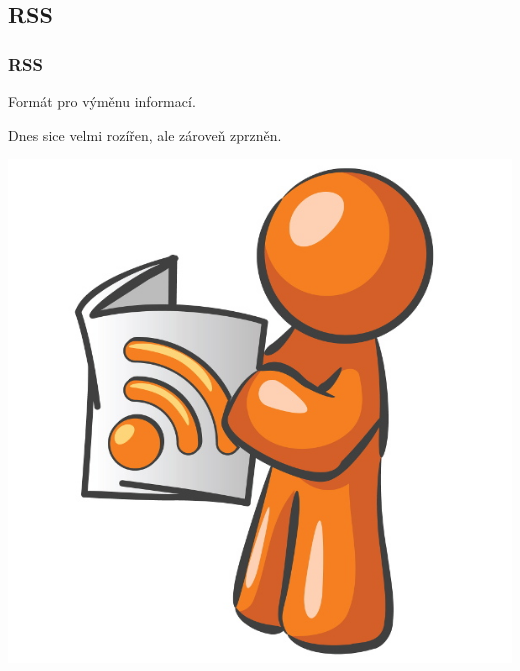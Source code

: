 \documentclass[xetex]{beamer}
\begin{document}
\subsection{RSS}
\begin{frame}
	\frametitle{RSS}

	Formát pro výměnu informací.

	\medskip

	Dnes sice velmi rozířen, ale zároveň zprzněn.

	\bigskip

	\includegraphics[scale=0.7]{images/rss.jpg}
\end{frame}
\end{document}
